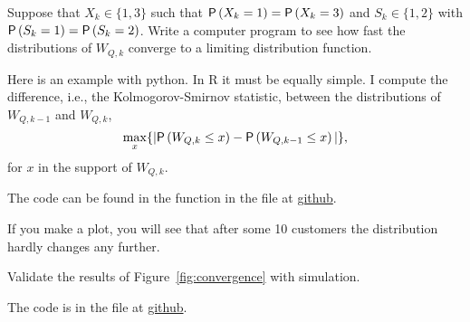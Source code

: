 \begin{exercise}
  Suppose that $X_k\in\{1,3\}$ such that $\P{X_k=1}=\P{X_k=3}$ and
  $S_k\in\{1,2\}$ with $\P{S_k=1}=\P{S_k=2}$. Write a computer program
  to see how fast the distributions of $W_{Q,k}$ converge to a limiting distribution function.
  \begin{solution}
Here is an example with python. In R it must be equally simple.
I compute the  difference, i.e., the Kolmogorov-Smirnov statistic, between
the distributions of $W_{Q,k-1}$ and $W_{Q,k}$, 
\begin{equation*}
  \max_x\{ |\P{W_{Q,k}\leq x} - \P{W_{Q,k-1}\leq x}|\},
\end{equation*}
for $x$ in the support of $W_{Q,k}$. 

The code can be found in the  function in the file  at
    \href{https://github.com/ndvanforeest/queueing_book/tree/master/progs}{github}.

If you make a plot, you will see that after some 10 customers the distribution hardly changes any further. 

  \end{solution}
  \end{exercise}

\begin{exercise}
  Validate the results of  Figure~\ref{fig:convergence} with simulation.
  \begin{solution}
    The code is in the file  at
    \href{https://github.com/ndvanforeest/queueing_book/tree/master/progs}{github}.
\end{solution}
\end{exercise}



